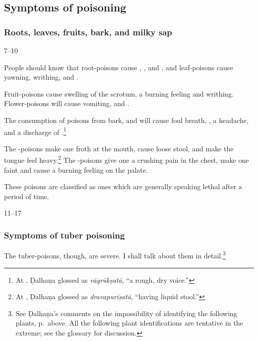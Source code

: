 \begin{translation}
    
\subsection{Symptoms of poisoning}

\subsubsection{Roots, leaves, fruits, bark, and milky sap} 

\item[7--10]
    
People should know that root-poisons cause ,
, and , and  leaf-poisons
cause yawning, writhing, and .
    
 Fruit-poisons cause swelling of the
   scrotum, a burning feeling and writhing.  Flower-poisons will
    cause vomiting,  and .  
    
The consumption of poisons from bark,  and
 will cause foul breath, ,
a headache, and a discharge of .\footnote{At
    , Ḍalhaṇa glossed  as
    \emph{vāgrūkṣatā}, “a rough, dry voice.”}
    
The -poisons make one froth at the mouth,  cause
loose stool, and make the tongue feel heavy.\footnote{At
    , Ḍalhaṇa glossed  as
    \emph{dravapurīṣatā}, “having liquid stool.” }  The
    -poisons give one a crushing pain in the chest,
    make one faint and cause a burning feeling on the palate.
    
    These poisons
    are classified as ones which are generally speaking lethal after a period of time.
    
    \item[11--17]
    
    \subsubsection{Symptoms of tuber poisoning} 
    
    The tuber-poisons,
though, are severe.  I shall talk about them in
detail.\footnote{See Ḍalhaṇa's comments on the impossibility of
    identifying the following plants, p.\,\pageref{kiratas} above. 
    All the following plant identifications are tentative in the
    extreme; see the glossary for discussion.}
    

\end{translation}
